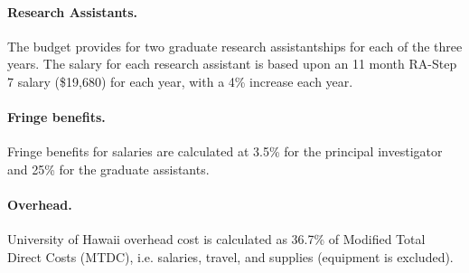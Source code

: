 \documentclass{proposalnsf}
\begin{document}
\paragraph*{Research Assistants.}  
The budget provides for two graduate research assistantships
for each of the three years.  The salary for each research assistant is
based upon an 11 month RA-Step 7 salary (\$19,680) for each year, with a 
4\% increase each year. 

\paragraph*{Fringe benefits.} 
Fringe benefits for salaries are calculated at 3.5\% for the principal
investigator and 25\% for the graduate assistants.

\paragraph*{Overhead.}  
University of Hawaii overhead cost is calculated as 36.7\% of Modified Total
Direct Costs (MTDC), i.e. salaries, travel, and supplies (equipment is
excluded).
\end{document}
